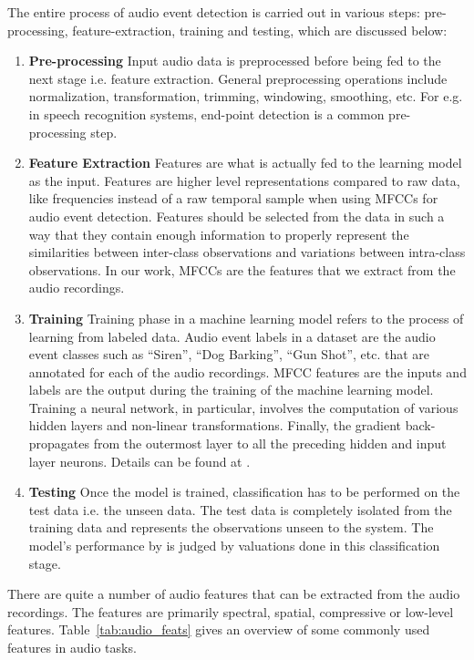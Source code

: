 The entire process of audio event detection is carried out in various steps: pre-processing, feature-extraction, training and testing, which are discussed below:
\begin{enumerate}
\item \textbf{Pre-processing} Input audio data is preprocessed before being fed to the next stage i.e. feature extraction. General preprocessing operations include normalization, transformation, trimming, windowing, smoothing, etc. For e.g. in speech recognition systems, end-point detection is a common pre-processing step.
\item \textbf{Feature Extraction} Features are what is actually fed to the learning model as the input. Features are higher level representations compared to raw data, like frequencies instead of a raw temporal sample when using MFCCs for audio event detection. Features should be selected from the data in such a way that they contain enough information to properly represent the similarities between inter-class observations and variations between intra-class observations. In our work, MFCCs are the features that we extract from the audio recordings. \item \textbf{Training} Training phase in a machine learning model refers to the process of learning from labeled data. Audio event labels in a dataset are the audio event classes such as “Siren”, “Dog Barking”, “Gun Shot”, etc. that are annotated for each of the audio recordings. MFCC features are the inputs and labels are the output during the training of the machine learning model. Training a neural network, in particular, involves the computation of various hidden layers and non-linear transformations. Finally, the gradient back-propagates from the outermost layer to all the preceding hidden and input layer neurons. Details can be found at \cite{hastie2005elements}. \item \textbf{Testing} Once the model is trained, classification has to be performed on the test data i.e. the unseen data. The test data is completely isolated from the training data and represents the observations unseen to the system. The model’s performance by is judged by valuations done in this classification stage.
\end{enumerate}

There are quite a number of audio features that can be extracted from the audio recordings. The features are primarily spectral, spatial, compressive or low-level features. Table~\ref{tab:audio_feats} gives an overview of some commonly used features in audio tasks.

